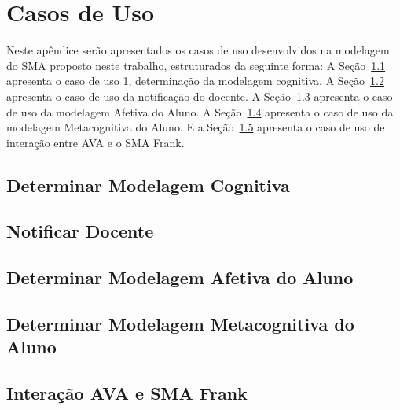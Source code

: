 \chapter{Casos de Uso}

Neste apêndice serão apresentados os casos de uso desenvolvidos na modelagem do SMA proposto neste trabalho, estruturados da seguinte forma: A Seção~\ref{chapter:uc1} apresenta o caso de uso 1, determinação da modelagem cognitiva. A Seção~\ref{chapter:uc2} apresenta o caso de uso da notificação do docente. A Seção~\ref{chapter:uc3} apresenta o caso de uso da modelagem Afetiva do Aluno. A Seção~\ref{chapter:uc4} apresenta o caso de uso da modelagem Metacognitiva do Aluno. E a Seção~\ref{chapter:uc5} apresenta o caso de uso de interação entre AVA e o SMA Frank.

\section{Determinar Modelagem Cognitiva}\label{chapter:uc1}
  

\section{Notificar Docente}\label{chapter:uc2}
  

\section{Determinar Modelagem Afetiva do Aluno}\label{chapter:uc3}
  

\section{Determinar Modelagem Metacognitiva do Aluno}\label{chapter:uc4}
  

\section{Interação AVA e SMA Frank}\label{chapter:uc5}
  
